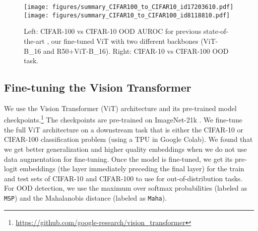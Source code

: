 \documentclass{article}
\begin{document}
\begin{wrapfigure}{r}{0.5\textwidth}
	\centering
	\vspace{-2em}
	\texttt{[image: figures/summary\_CIFAR100\_to\_CIFAR10\_id17203610.pdf]} \texttt{[image: figures/summary\_CIFAR10\_to\_CIFAR100\_id8118810.pdf]}
\vspace{-2em}
	\caption{Left: CIFAR-100 vs CIFAR-10 OOD AUROC for previous state-of-the-art \cite{zhang2020hybrid}, our fine-tuned ViT with two different backbones (ViT-B\_16 and R50+ViT-B\_16). 
Right: CIFAR-10 vs CIFAR-100 OOD task.}
	\label{fig:summary_plots}
	\vspace{-1em}
\end{wrapfigure}
\subsection{Fine-tuning the Vision Transformer}\label{sec:finetuned:vit}
We use the Vision Transformer (ViT) architecture \citep{dosovitskiy2020image} and its pre-trained model checkpoints.\footnote{\url{https://github.com/google-research/vision_transformer}} The checkpoints are pre-trained on ImageNet-21k \citep{5206848}. We fine-tune the full ViT architecture on a downstream task that is either the CIFAR-10 or CIFAR-100 classification problem (using a TPU in Google Colab). We found that we get better generalization and higher quality embeddings when we do not use data augmentation for fine-tuning. Once the model is fine-tuned, we get its pre-logit embeddings (the layer immediately preceding the final layer) for the train and test sets of CIFAR-10 and CIFAR-100 to use for out-of-distribution tasks. 
For OOD detection, we use the maximum over softmax probabilities (labeled as \verb|MSP|) and the  
Mahalanobis distance (labeled as \verb|Maha|).  
\end{document}
